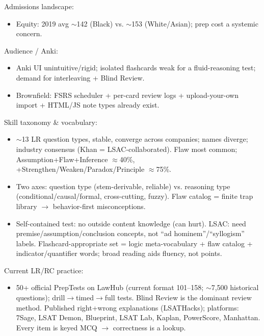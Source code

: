 \documentclass[11pt]{article}
\begin{document}
Admissions landscape:
\begin{itemize}
\item Equity: 2019 avg $\sim$142 (Black) vs. $\sim$153 (White/Asian); prep cost a systemic concern.
\end{itemize}

Audience / Anki:
\begin{itemize}
\item Anki UI unintuitive/rigid; isolated flashcards weak for a fluid-reasoning test; demand for interleaving + Blind Review.
\item Brownfield: FSRS scheduler + per-card review logs + upload-your-own import + HTML/JS note types already exist.
\end{itemize}

Skill taxonomy \& vocabulary:
\begin{itemize}
\item $\sim$13 LR question types, stable, converge across companies; names diverge; industry consensus (Khan = LSAC-collaborated). Flaw most common; Assumption+Flaw+Inference $\approx$40\%, +Strengthen/Weaken/Paradox/Principle $\approx$75\%.
\item Two axes: question type (stem-derivable, reliable) vs. reasoning type (conditional/causal/formal, cross-cutting, fuzzy). Flaw catalog = finite trap library $\rightarrow$ behavior-first misconceptions.
\item Self-contained test: no outside content knowledge (can hurt). LSAC: need premise/assumption/conclusion concepts, not \enquote{ad hominem}/\enquote{syllogism} labels. Flashcard-appropriate set = logic meta-vocabulary + flaw catalog + indicator/quantifier words; broad reading aids fluency, not points.
\end{itemize}

Current LR/RC practice:
\begin{itemize}
\item 50+ official PrepTests on LawHub (current format 101--158; $\sim$7,500 historical questions); drill$\rightarrow$timed$\rightarrow$full tests. Blind Review is the dominant review method. Published right+wrong explanations (LSATHacks); platforms: 7Sage, LSAT Demon, Blueprint, LSAT Lab, Kaplan, PowerScore, Manhattan. Every item is keyed MCQ $\rightarrow$ correctness is a lookup.
\end{itemize}
\end{document}
